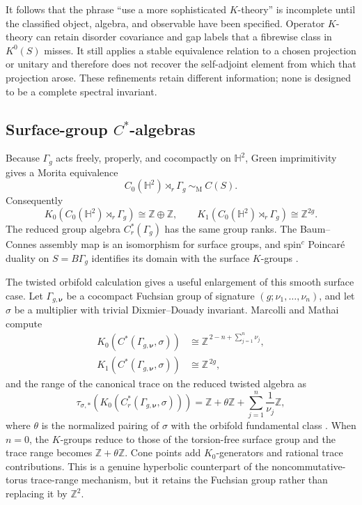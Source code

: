 \documentclass[11pt]{article}
\theoremstyle{definition}
\theoremstyle{remark}
\newcommand{\HH}{\mathbb H}
\newcommand{\ZZ}{\mathbb Z}
\begin{document}
It follows that the phrase ``use a more sophisticated \(K\)-theory'' is
incomplete until the classified object, algebra, and observable have been
specified.  Operator \(K\)-theory can retain disorder covariance and gap
labels that a fibrewise class in \(K^0(S)\) misses.  It still applies a
stable equivalence relation to a chosen projection or unitary and therefore
does not recover the self-adjoint element from which that projection arose.
These refinements retain different information; none is designed to be a
complete spectral invariant.

\subsection{Surface-group \texorpdfstring{\(C^*\)}{C-star}-algebras}

Because \(\Gamma_g\) acts freely, properly, and cocompactly on \(\HH^2\),
Green imprimitivity gives a Morita equivalence
\[
       C_0(\HH^2)\rtimes_r\Gamma_g
                 \ \sim_{\mathrm M}\ C(S).
       \tag{9.1}\label{eq:green-morita}
\]
Consequently
\[
 K_0\!\left(C_0(\HH^2)\rtimes_r\Gamma_g\right)\cong\ZZ\oplus\ZZ,
 \qquad
 K_1\!\left(C_0(\HH^2)\rtimes_r\Gamma_g\right)\cong\ZZ^{2g}.
 \tag{9.2}\label{eq:crossed-k}
\]
The reduced group algebra \(C_r^*(\Gamma_g)\) has the same group ranks.  The
Baum--Connes assembly map is an isomorphism for surface groups, and
spin\(^{c}\) Poincar\'e duality on \(S=B\Gamma_g\) identifies its domain with
the surface \(K\)-groups
\cite{BaumConnesHigson,HigsonKasparov,GreenImprimitivity}.

The twisted orbifold calculation gives a useful enlargement of this smooth
surface case.  Let \(\Gamma_{g,\bm\nu}\) be a cocompact Fuchsian group of
signature \((g;\nu_1,\ldots,\nu_n)\), and let \(\sigma\) be a multiplier with
trivial Dixmier--Douady invariant.  Marcolli and Mathai compute
\[
\begin{aligned}
 K_0\!\left(C^*(\Gamma_{g,\bm\nu},\sigma)\right)
    &\cong \ZZ^{\,2-n+\sum_{j=1}^n\nu_j},\\
 K_1\!\left(C^*(\Gamma_{g,\bm\nu},\sigma)\right)
    &\cong \ZZ^{\,2g},
\end{aligned}
\]
and the range of the canonical trace on the reduced twisted algebra as
\[
 \tau_{\sigma,*}\!
 \left(K_0\!\left(C_r^*(\Gamma_{g,\bm\nu},\sigma)\right)\right)
   =\ZZ+\theta\ZZ+\sum_{j=1}^n\frac1{\nu_j}\ZZ ,
\]
where \(\theta\) is the normalized pairing of \(\sigma\) with the orbifold
fundamental class \cite{MarcolliMathai1999}.  When \(n=0\), the \(K\)-groups
reduce to those of the torsion-free surface group and the trace range becomes
\(\ZZ+\theta\ZZ\).  Cone points add \(K_0\)-generators and rational trace
contributions.  This is a genuine hyperbolic counterpart of the
noncommutative-torus trace-range mechanism, but it retains the Fuchsian group
rather than replacing it by \(\ZZ^2\).
\end{document}

